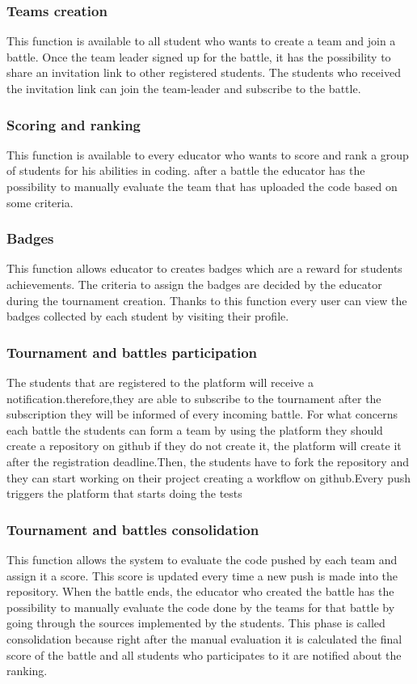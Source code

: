 \subsubsection{Teams creation}
This function is available to all student who wants to create a team and join a battle. Once the team leader signed up for the battle, it has the possibility to share an invitation link to other registered students. The students who received the invitation link can join the team-leader and subscribe to the battle.

\subsubsection{Scoring and ranking}
This function is available to every educator who wants to score and rank a group of students for his abilities in coding. after a battle the educator has the possibility to manually evaluate the team that has uploaded the code based on some criteria.

\subsubsection{Badges}
This function allows educator to creates badges which are a reward for students achievements. The criteria to assign the badges are decided by the educator during the tournament creation.
Thanks to this function every user can view the badges collected by each student by visiting their profile.

\subsubsection{Tournament and battles participation}
The students that are registered to the platform will receive a notification.therefore,they are able to subscribe to the tournament after the subscription they will be informed of every incoming battle.
For what concerns each battle the students can form a team by using the platform they should create a repository on github if they do not create it, the platform will create it after the registration deadline.Then, the students have to fork the repository and they can start working on their project creating a workflow on github.Every push triggers the platform that starts doing the tests

\subsubsection{Tournament and battles consolidation}
This function allows the system to evaluate the code pushed by each team and assign it a score. This score is updated every time a new push is made into the repository.
When the battle ends, the educator who created the battle has the possibility to manually evaluate the code done by the teams for that battle by going through the sources implemented by the students. This phase is called consolidation because right after the manual evaluation it is calculated the final score of the battle and all students who participates to it are notified about the ranking.

